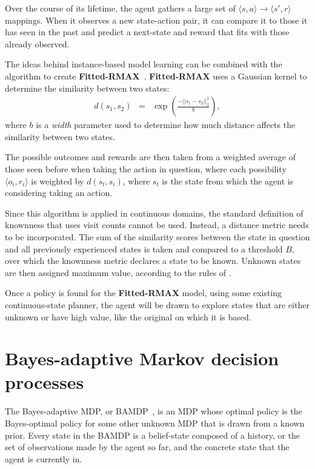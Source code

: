 Over the course of its lifetime, the agent gathers a large set of $\langle s, a\rangle \rightarrow \langle s', r \rangle$ mappings. When it observes a new state-action pair, it can compare it to those it has seen in the past and predict a next-state and reward that fits with those already observed.

The ideas behind instance-based model learning can be combined with the  algorithm to create {\bf Fitted-RMAX}~\cite{jong07}. {\bf Fitted-RMAX} uses a Gaussian kernel to determine the similarity between two states:
\begin{eqnarray}
d(s_1,s_2)&=&\exp\left(\frac{-||s_1 - s_2||^2_2}{b}\right),
\end{eqnarray}
where $b$ is a \emph{width} parameter used to determine how much distance affects the similarity between two states.

The possible outcomes and rewards are then taken from a weighted average of those seen before when taking the action in question, where each possibility $\langle o_i, r_i \rangle$ is weighted by $d(s_t, s_i)$, where $s_t$ is the state from which the agent is considering taking an action.

Since this algorithm is applied in continuous domains, the standard definition of knownness that uses visit counts cannot be used.  Instead, a distance metric needs to be incorporated. The sum of the similarity scores between the state in question and all previously experienced states is taken and compared to a threshold $B$, over which the knownness metric declares a state to be known. Unknown states are then assigned maximum value, according to the rules of .

Once a policy is found for the {\bf Fitted-RMAX} model, using some existing continuous-state planner, the agent will be drawn to explore states that are either unknown or have high value, like the original  on which it is based.



\section{Bayes-adaptive Markov decision processes}


The Bayes-adaptive MDP, or BAMDP~\cite{duff03}, is an MDP whose optimal policy is the Bayes-optimal policy for some other unknown MDP that is drawn from a known prior. Every state in the BAMDP is a belief-state composed of a history, or the set of observations made by the agent so far, and the concrete state that the agent is currently in.

